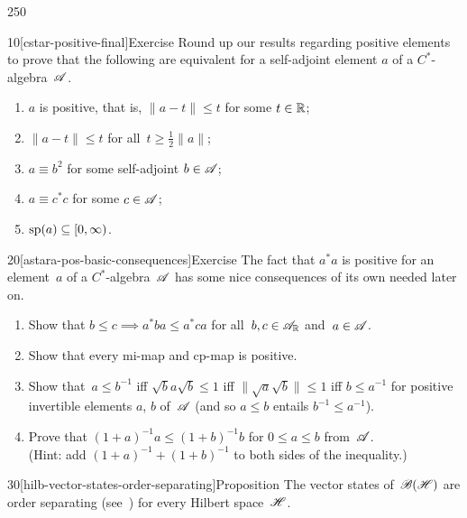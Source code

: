 \begin{parsec}{250}
\begin{point}{10}[cstar-positive-final]{Exercise}%
%
Round up our results regarding positive elements
to 
prove that
the following are equivalent
for a self-adjoint element $a$ of a $C^*$-algebra~$\mathscr{A}$.
\begin{enumerate}
\item 
$a$ is positive, that is,  $\|a-t\|\leq t$
for some $t\in \mathbb{R}$;
\item
$\|a-t\|\leq t$ for all~$t\geq \frac{1}{2}\|a\|$;
\item
$a\equiv b^2$ for some self-adjoint $b\in\mathscr{A}$;
\item
$a\equiv c^* c$ for some $c\in\mathscr{A}$;
\item
$\mathrm{sp}(a)\subseteq [0,\infty)$.
\end{enumerate}
\end{point}
\begin{point}{20}[astara-pos-basic-consequences]{Exercise}%
The fact that $a^*a$ is positive
for an element~$a$ of a $C^*$-algebra~$\mathscr{A}$
has some nice consequences
of its own needed later on.
\begin{enumerate}
\item
Show that $b\leq c\implies a^*ba \leq a^*ca$
for all~$b,c\in\mathscr{A}_{\mathbb{R}}$ and~$a\in\mathscr{A}$.
\item
Show that every mi-map and cp-map is positive.
\item
Show that~$a\leq b^{-1}$ 
iff $\sqrt{b}a\sqrt{b}\leq 1$
iff $\|\sqrt{a}\sqrt{b}\|\leq 1$
iff $b\leq a^{-1}$
for positive invertible elements $a$, $b$ of~$\mathscr{A}$
(and so $a\leq b$ entails $b^{-1}\leq a^{-1}$).
\item
Prove that $(1+a)^{-1}a\leq (1+b)^{-1}b$
for $0\leq a\leq b$ from~$\mathscr{A}$.\\
(Hint: add $(1+a)^{-1} + (1+b)^{-1}$
to both sides of the inequality.)
\end{enumerate}
\end{point}
\begin{point}{30}[hilb-vector-states-order-separating]{Proposition}%
The vector states
of~$\mathscr{B}(\mathscr{H})$
are order separating (see~)
for every Hilbert space~$\mathscr{H}$.
\end{point}
\end{parsec}
